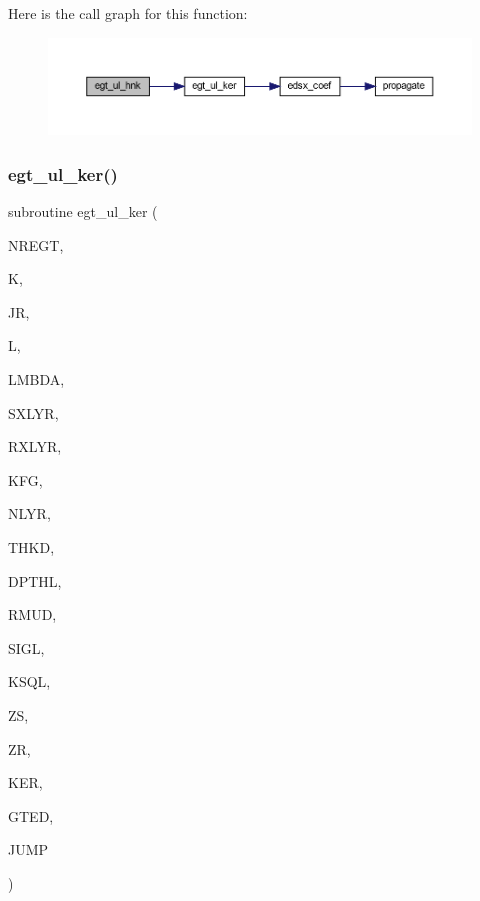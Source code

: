 Here is the call graph for this function\+:\nopagebreak
\begin{figure}[H]
\begin{center}
\leavevmode
\includegraphics[width=350pt]{Leroi__c_8f90_a1d1da4021109f56adcc9ad84d89cd1b7_cgraph}
\end{center}
\end{figure}
\mbox{\label{Leroi__c_8f90_a8f7098d7bc36902fbbda312874c15120}} 
\subsubsection{\texorpdfstring{egt\+\_\+ul\+\_\+ker()}{egt\_ul\_ker()}}
{\footnotesize\ttfamily subroutine egt\+\_\+ul\+\_\+ker (\begin{DoxyParamCaption}\item[{integer}]{N\+R\+E\+GT,  }\item[{integer}]{K,  }\item[{integer}]{JR,  }\item[{integer}]{L,  }\item[{real(kind=ql)}]{L\+M\+B\+DA,  }\item[{integer}]{S\+X\+L\+YR,  }\item[{integer}]{R\+X\+L\+YR,  }\item[{integer}]{K\+FG,  }\item[{integer}]{N\+L\+YR,  }\item[{real(kind=ql), dimension (nlyr)}]{T\+H\+KD,  }\item[{real(kind=ql), dimension (nlyr)}]{D\+P\+T\+HL,  }\item[{real(kind=ql), dimension(0\+:nlyr)}]{R\+M\+UD,  }\item[{complex(kind=ql), dimension (nlyr)}]{S\+I\+GL,  }\item[{complex(kind=ql), dimension (nlyr)}]{K\+S\+QL,  }\item[{real(kind=ql)}]{ZS,  }\item[{real(kind=ql)}]{ZR,  }\item[{complex (kind=ql), dimension(jnlo-\/nregt\+:jnhi,7)}]{K\+ER,  }\item[{complex (kind=ql), dimension(nregt,7)}]{G\+T\+ED,  }\item[{logical}]{J\+U\+MP }\end{DoxyParamCaption})}

